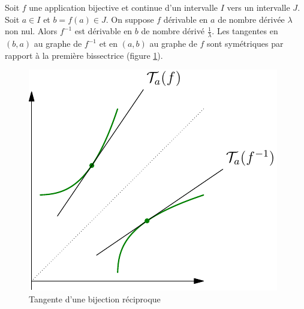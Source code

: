 \begin{prop}
 Soit $f$ une application bijective et continue d'un intervalle $I$ vers un intervalle $J$. Soit $a\in I$ et $b=f(a)\in J$. On suppose $f$ dérivable en $a$ de nombre dérivée $\lambda$ non nul. Alors $f^{-1}$ est dérivable en $b$ de nombre dérivé $\frac{1}{\lambda}$.\newline
 Les tangentes en $(b,a)$ au graphe de $f^{-1}$ et en $(a,b)$ au graphe de $f$ sont symétriques par rapport à la première bissectrice (figure \ref{fig:C2070_2}).
\end{prop}
\begin{figure}[h]
 \centering
 \includegraphics{./C2070_2.pdf}
 \caption{Tangente d'une bijection réciproque}
 \label{fig:C2070_2}
\end{figure}

